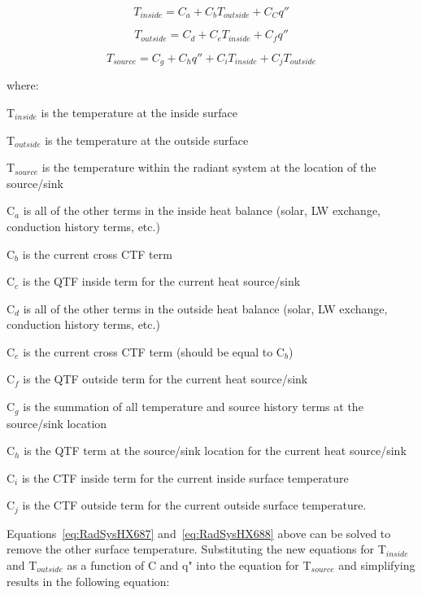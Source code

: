 {\begin{equation}
{T_{inside}} = {C_a} + {C_b}{T_{outside}} + {C_C}q''
\label{eq:RadSysHX687}
\end{equation}

\begin{equation}
{T_{outside}} = {C_d} + {C_e}{T_{inside}} + {C_f}q''
\label{eq:RadSysHX688}
\end{equation}

\begin{equation}
{T_{source}} = {C_g} + {C_h}q'' + {C_i}{T_{inside}} + {C_j}{T_{outside}}
\end{equation}

where:

T\(_{inside}\) is the temperature at the inside surface

T\(_{outside}\) is the temperature at the outside surface

T\(_{source}\) is the temperature within the radiant system at the location of the source/sink

C\(_{a}\) is all of the other terms in the inside heat balance (solar, LW exchange, conduction history terms, etc.)

C\(_{b}\) is the current cross CTF term

C\(_{c}\) is the QTF inside term for the current heat source/sink

C\(_{d}\) is all of the other terms in the outside heat balance (solar, LW exchange, conduction history terms, etc.)

C\(_{e}\) is the current cross CTF term (should be equal to C\(_b\))

C\(_{f}\) is the QTF outside term for the current heat source/sink

C\(_{g}\) is the summation of all temperature and source history terms at the source/sink location

C\(_{h}\) is the QTF term at the source/sink location for the current heat source/sink

C\(_{i}\) is the CTF inside term for the current inside surface temperature

C\(_{j}\) is the CTF outside term for the current outside surface temperature.

Equations~\ref{eq:RadSysHX687} and~\ref{eq:RadSysHX688} above can be solved to remove the other surface temperature. Substituting the new equations for T\(_{inside}\) and T\(_{outside}\) as a function of C and q" into the equation for T\(_{source}\) and simplifying results in the following equation:

}
